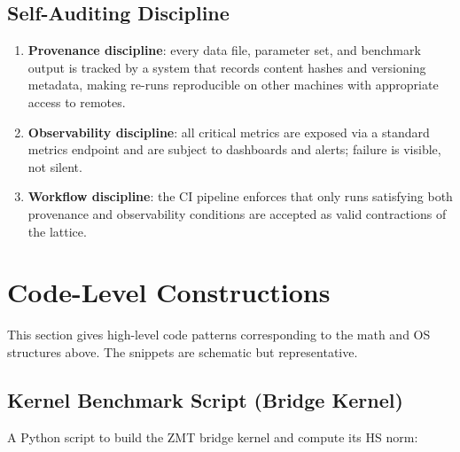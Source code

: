 \documentclass[11pt]{article}
\begin{document}
\subsection{Self-Auditing Discipline}

\begin{enumerate}[leftmargin=*]
  \item \textbf{Provenance discipline}: every data file, parameter set, and benchmark output is tracked by a system that records content hashes and versioning metadata, making re-runs reproducible on other machines with appropriate access to remotes.
  \item \textbf{Observability discipline}: all critical metrics are exposed via a standard metrics endpoint and are subject to dashboards and alerts; failure is visible, not silent.
  \item \textbf{Workflow discipline}: the CI pipeline enforces that only runs satisfying both provenance and observability conditions are accepted as valid contractions of the lattice.
\end{enumerate}

\section{Code-Level Constructions}

This section gives high-level code patterns corresponding to the math and OS structures above. The snippets are schematic but representative.

\subsection{Kernel Benchmark Script (Bridge Kernel)}

A Python script to build the ZMT bridge kernel and compute its HS norm:
\end{document}

